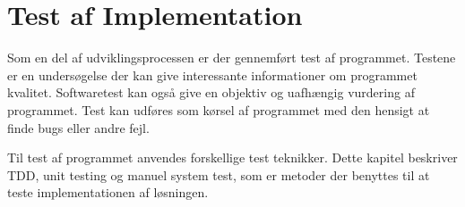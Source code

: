 \chapter{Test af Implementation}
Som en del af udviklingsprocessen er der gennemført test af programmet. Testene er en undersøgelse der kan give interessante informationer om programmet kvalitet. Softwaretest kan også give en objektiv og uafhængig vurdering af programmet. Test kan udføres som kørsel af programmet med den hensigt at finde bugs eller andre fejl.

Til test af programmet anvendes forskellige test teknikker. Dette kapitel beskriver TDD, unit testing og manuel system test, som er metoder der benyttes til at teste implementationen af løsningen.



